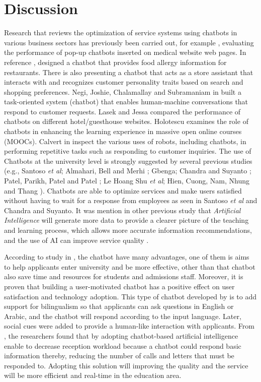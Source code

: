 \documentclass[conference]{IEEEtran}
\begin{document}
\section{Discussion}
Research that reviews the optimization of service systems using chatbots in various business sectors has previously been carried out, for example \cite{b6}, evaluating the performance of pop-up chatbots inserted on medical website web pages. In reference \cite{b7}, designed a chatbot that provides food allergy information for restaurants. There is also \cite{b8} presenting a chatbot that acts as a store assistant that interacts with and recognizes customer personality traits based on search and shopping preferences. Negi, Joshie, Chalamallay and Subramaniam in \cite{b9} built a task-oriented system (chatbot) that enables human-machine conversations that respond to customer requests. Lasek and Jessa \cite{b10} compared the performance of chatbots on different hotel/guesthouse websites. Holotescu \cite{b11} examines the role of chatbots in enhancing the learning experience in massive open online courses (MOOCs). Calvert in \cite{b12} inspect the various uses of robots, including chatbots, in performing repetitive tasks such as responding to customer inquiries.
The use of Chatbots at the university level is strongly suggested by several previous studies (e.g., Santoso \emph{et al}\cite{b19}; Almahari, Bell and Merhi \cite{b20};  Gbenga\cite{b20}; Chandra and Suyanto \cite{b21}; Patel, Parikh, Patel and Patel \cite{b23}; Le Hoang Shu \emph{et al}\cite{b24}; Hien, Cuong, Nam, Nhung and Thang \cite{b25}). Chatbots are able to optimize services and make users satisfied without having to wait for a response from employees as seen in Santoso \emph{et al}\cite{b19} and Chandra and Suyanto\cite{b22}. It was mention in other previous study that \emph{Artificial Intelligence} will generate more data to provide a clearer picture of the teaching and learning process, which allows more accurate information recommendations, and the use of AI can improve service quality \cite{b23}.

According to study in \cite{b26}, the chatbot have many advantages, one of them is aims to help applicants enter university and be more effective, other than that chatbot also save time and resources for students and admissions staff. Moreover, it is proven that building a user-motivated chatbot has a positive effect on user satisfaction and technology adoption. This type of chatbot developed by \cite{b26} is to add support for bilingualism so that applicants can ask questions in English or Arabic, and the chatbot will respond according to the input language. Later, social cues were added to provide a human-like interaction with applicants. From \cite{b21}, the researchers found that by adopting chatbot-based artificial intelligence enable to decrease reception workload because a chatbot could respond basic information thereby, reducing the number of calls and letters that must be responded to. Adopting this solution will improving the quality and the service will be more efficient and real-time in the education area.
\end{document}
